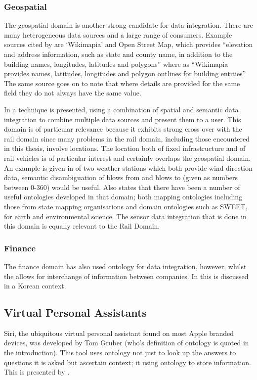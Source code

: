 \subsubsection{Geospatial}
The geospatial domain is another strong candidate for data integration. There are many heterogeneous data sources and a large range of consumers. Example sources cited by \citet{Zhang2013} are `Wikimapia' and Open Street Map, which provides ``elevation and address information, such as state and county name, in addition to the building names, longitudes, latitudes and polygons'' where as  ``Wikimapia provides names, latitudes, longitudes and polygon outlines for building entities'' The same source goes on to note that where details are provided for the same field they do not always have the same value. 

In \citet{Zhang2013} a technique is presented, using a combination of spatial and semantic data integration to combine multiple data sources and present them to a user. This domain is of particular relevance because it exhibits strong cross over with the rail domain since many problems in the rail domain, including those encountered in this thesis, involve locations. The location both of fixed infrastructure and of rail vehicles is of particular interest and certainly overlaps the geospatial domain. An example is given in \citet{Janowicz2012} of two weather stations which both provide wind direction data, semantic disambiguation of blows from and blows to (given as numbers between 0-360) would be useful. \citet{Janowicz2012} Also states that there have been a number of useful ontologies developed in that domain; both mapping ontologies including those from state mapping organisations and domain ontologies such as SWEET, for earth and environmental science. The sensor data integration that is done in this domain is equally relevant to the Rail Domain.
\subsubsection{Finance}
The finance domain has also used ontology for data integration, however, whilst the  allows for interchange of information between companies. In \citet{Kim2004} this is discussed in a Korean context.
\subsection{Virtual Personal Assistants}
Siri, the ubiquitous virtual personal assistant found on most Apple branded devices, was developed by Tom Gruber (who's definition of ontology is quoted in the introduction). This tool uses ontology not just to look up the answers to questions it is asked but ascertain context; it using ontology to store information. This is presented by \citet{Gruber2009}.

